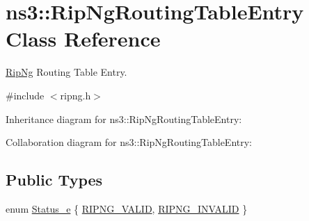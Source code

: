 \hypertarget{classns3_1_1RipNgRoutingTableEntry}{}\section{ns3\+:\+:Rip\+Ng\+Routing\+Table\+Entry Class Reference}
\label{classns3_1_1RipNgRoutingTableEntry}


\hyperlink{classns3_1_1RipNg}{Rip\+Ng} Routing Table Entry.  




{\ttfamily \#include $<$ripng.\+h$>$}



Inheritance diagram for ns3\+:\+:Rip\+Ng\+Routing\+Table\+Entry\+:


Collaboration diagram for ns3\+:\+:Rip\+Ng\+Routing\+Table\+Entry\+:
\subsection*{Public Types}
\begin{DoxyCompactItemize}
\item 
enum \hyperlink{classns3_1_1RipNgRoutingTableEntry_af723fc23e97afdd05c55da5162b7e673}{Status\+\_\+e} \{ \hyperlink{classns3_1_1RipNgRoutingTableEntry_af723fc23e97afdd05c55da5162b7e673a334e33ca88fb2b8de53c814814d3c017}{R\+I\+P\+N\+G\+\_\+\+V\+A\+L\+ID}, 
\hyperlink{classns3_1_1RipNgRoutingTableEntry_af723fc23e97afdd05c55da5162b7e673a16a0f0e9e3e3ce9998da183ec37f870a}{R\+I\+P\+N\+G\+\_\+\+I\+N\+V\+A\+L\+ID}
 \}
\end{DoxyCompactItemize}
